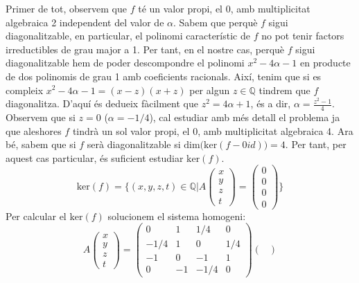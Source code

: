 \documentclass[11pt,a4paper]{article}
\begin{document}
\begin{enumerate}
    Primer de tot, observem que $f$ té un valor propi, el 0, amb multiplicitat algebraica 2 independent del valor de $\alpha$. Sabem que perquè $f$ sigui diagonalitzable, en particular, el polinomi característic de $f$ no pot tenir factors irreductibles de grau major a 1. Per tant, en el nostre cas, perquè $f$ sigui diagonalitzable hem de poder descompondre el polinomi $x^2-4\alpha-1$ en producte de dos polinomis de grau 1 amb coeficients racionals. Així, tenim que si es compleix $x^2-4\alpha-1=(x-z)(x+z)$ per algun $z\in\mathbb{Q}$ tindrem que $f$ diagonalitza. D'aquí és dedueix fàcilment que $z^2=4\alpha+1$, és a dir, $\alpha=\frac{z^2-1}{4}$. Observem que si $z=0$ ($\alpha=-1/4$), cal estudiar amb més detall el problema ja que aleshores $f$ tindrà un sol valor propi, el 0, amb multiplicitat algebraica 4. Ara bé, sabem que si $f$ serà diagonalitzable si $\text{dim(ker}(f-0id))=4$. Per tant, per aquest cas particular, és suficient estudiar $\text{ker}(f)$.
    \begin{equation*}
        \text{ker}(f)=\{(x,y,z,t)\in \mathbb{Q}|A\begin{pmatrix}
                x\\
                y\\
                z\\
                t
            \end{pmatrix}=\begin{pmatrix}
                0\\
                0\\
                0\\
                0
            \end{pmatrix}\}
    \end{equation*}
    Per calcular el $\text{ker}(f)$ solucionem el sistema homogeni:
    \begin{equation*}
            A\begin{pmatrix}
                x\\
                y\\
                z\\
                t
            \end{pmatrix}=\begin{pmatrix}
                0 & 1 & 1/4 & 0\\
                -1/4 & 1 & 0 & 1/4\\
                -1 & 0 & -1 & 1\\
                0 & -1 & -1/4 & 0
            \end{pmatrix}\begin{pmatrix}

\end{pmatrix}
\end{equation*}
\end{enumerate}
\end{document}

